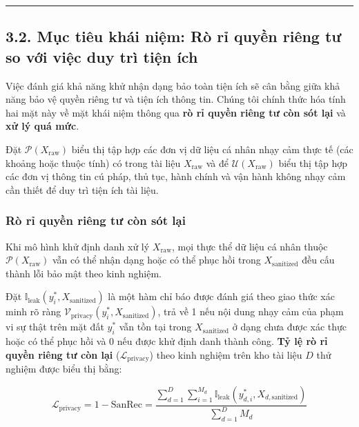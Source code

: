 \documentclass[
  11pt,
  a4paper,
]{article}
\begin{document}
\begin{center}\rule{0.5\linewidth}{0.5pt}\end{center}

\subsection{3.2. Mục tiêu khái niệm: Rò rỉ quyền riêng tư so với việc
duy trì tiện
ích}\label{mux1ee5c-tiuxeau-khuxe1i-niux1ec7m-ruxf2-rux1ec9-quyux1ec1n-riuxeang-tux1b0-so-vux1edbi-viux1ec7c-duy-truxec-tiux1ec7n-uxedch}

Việc đánh giá khả năng khử nhận dạng bảo toàn tiện ích sẽ cân bằng giữa
khả năng bảo vệ quyền riêng tư và tiện ích thông tin. Chúng tôi chính
thức hóa tính hai mặt này về mặt khái niệm thông qua \textbf{rò rỉ quyền
riêng tư còn sót lại} và \textbf{xử lý quá mức}.

Đặt \(\mathcal{P}(X_{\text{raw}})\) biểu thị tập hợp các đơn vị dữ liệu
cá nhân nhạy cảm thực tế (các khoảng hoặc thuộc tính) có trong tài liệu
\(X_{\text{raw}}\) và để \(\mathcal{U}(X_{\text{raw}})\) biểu thị tập
hợp các đơn vị thông tin cú pháp, thủ tục, hành chính và vận hành không
nhạy cảm cần thiết để duy trì tiện ích tài liệu.

\subsubsection{Rò rỉ quyền riêng tư còn sót
lại}\label{ruxf2-rux1ec9-quyux1ec1n-riuxeang-tux1b0-cuxf2n-suxf3t-lux1ea1i}

Khi mô hình khử định danh xử lý \(X_{\text{raw}}\), mọi thực thể dữ liệu
cá nhân thuộc \(\mathcal{P}(X_{\text{raw}})\) vẫn có thể nhận dạng hoặc
có thể phục hồi trong \(X_{\text{sanitized}}\) đều cấu thành lỗi bảo mật
theo kinh nghiệm.

Đặt \(\mathbb{I}_{\text{leak}}(y_i^*, X_{\text{sanitized}})\) là một hàm
chỉ báo được đánh giá theo giao thức xác minh rõ ràng
\(\mathcal{V}_{\text{privacy}}(y_i^*, X_{\text{sanitized}})\), trả về 1
nếu nội dung nhạy cảm của phạm vi sự thật trên mặt đất \(y_i^*\) vẫn tồn
tại trong \(X_{\text{sanitized}}\) ở dạng chưa được xác thực hoặc có thể
phục hồi và 0 nếu được khử định danh thành công. \textbf{Tỷ lệ rò rỉ
quyền riêng tư còn lại} (\(\mathcal{L}_{\text{privacy}}\)) theo kinh
nghiệm trên kho tài liệu \(D\) thử nghiệm được biểu thị bằng:

\[\mathcal{L}_{\text{privacy}} = 1 - \text{SanRec} = \frac{\sum_{d=1}^D \sum_{i=1}^{M_d} \mathbb{I}_{\text{leak}}(y_{d,i}^*, X_{d,\text{sanitized}})}{\sum_{d=1}^D M_d}\]
\end{document}
